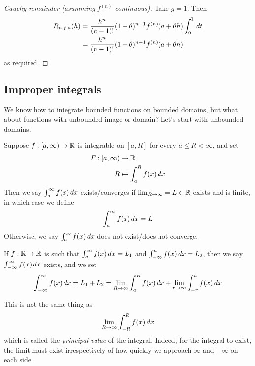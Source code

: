 \documentclass{../template/note}
\begin{document}
    \begin{proof}[Cauchy remainder (\emph{asumming \(f^{(n)}\) continuous})]
        Take \(g=1\). Then
        \begin{align*}
            R_{n,f,a}(h) &= \frac{h^n}{(n-1)!} (1-\theta)^{n-1} f^{(n)}(a+\theta h) \int_0^1 \,d{t} \\
            &= \frac{h^n}{(n-1)!} (1-\theta)^{n-1} f^{(n)}(a+\theta h)
        \end{align*}
        as required.
    \end{proof}
    
    \subsection{Improper integrals}

    We know how to integrate bounded functions on bounded domains, but what about functions with unbounded image or domain? Let's start with unbounded domains.

    \begin{definition}
        Suppose \(f: [a, \infty) \to \mathbb R\) is integrable on \([a, R]\) for every \(a \leq R < \infty\), and set
        \begin{align*}
            F: [a, \infty) &\to \mathbb R \\
            R &\mapsto \int_a^R f(x) \,d{x}
        \end{align*}
        Then we say \(\int_a^\infty f(x) \,d{x}\) exists/converges if \(\lim_{R \to \infty} = L \in \mathbb R\) exists and is finite, in which case we define
        \begin{align*}
            \int_a^\infty f(x) \,d{x} = L
        \end{align*}
        Otherwise, we say \(\int_a^\infty f(x) \,d{x}\) does not exist/does not converge.
        
        If \(f: \mathbb R \to \mathbb R\) is such that \(\int_a^\infty f(x) \,d{x} = L_1\) and \(\int_{-\infty}^a f(x) \,d{x} = L_2\), then we say \(\int_{-\infty}^\infty f(x) \,d{x}\) exists, and we set
        \begin{align*}
            \int_{-\infty}^\infty f(x) \,d{x} = L_1 + L_2 = \lim_{R \to \infty} \int_a^R f(x) \,d{x} + \lim_{r \to \infty} \int_{-r}^a f(x) \,d{x}
        \end{align*}
    \end{definition}
    
    \begin{remark*}
        This is not the same thing as
        \begin{align*}
            \lim_{R \to \infty} \int_{-R}^R f(x) \,d{x}
        \end{align*}
        which is called the \emph{principal value} of the integral. Indeed, for the integral to exist, the limit must exist irrespectively of how quickly we approach \(\infty\) and \(-\infty\) on each side.        
    \end{remark*}
    
\end{document}
